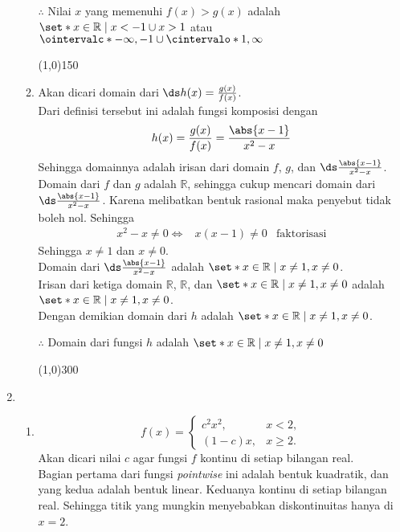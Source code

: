 \begin{enumerate}[leftmargin=*, label={\arabic*}.]
\begin{enumerate}[label={\alph*}.]
$\therefore$ Nilai $x$ yang memenuhi $f(x) > g(x)$ adalah
$\set*{x \in \mathbb{R} \mid x < -1 \cup x > 1}$
atau $\ointervalc*{-\infty, -1} \cup \cintervalo*{1, \infty}$

\begin{center}
    \line(1,0){150}
\end{center}
\item Akan dicari domain dari $\ds h(x) = \frac{g(x)}{f(x)}$.\\
Dari definisi tersebut ini adalah fungsi komposisi dengan 
\[
    h(x) = \frac{g(x)}{f(x)} = \frac{\abs{x-1}}{x^{2}-x}
\]
Sehingga domainnya adalah irisan dari domain $f$, $g$, dan 
$\ds \frac{\abs{x-1}}{x^{2}-x}$.\\
Domain dari $f$ dan $g$ adalah $\mathbb{R}$, sehingga cukup mencari 
domain dari $\ds \frac{\abs{x-1}}{x^{2}-x}$. Karena melibatkan 
bentuk rasional maka penyebut tidak boleh nol. Sehingga
\begin{align*}
    x^{2}-x \neq 0 \iff &x(x-1)\neq 0
    &\text{faktorisasi}
\end{align*}
Sehingga $x \neq 1$ dan $x \neq 0$. \\Domain dari 
$\ds \frac{\abs{x-1}}{x^{2}-x}$ adalah 
$\set*{x \in \mathbb{R} \mid x \neq 1, x\neq 0}$.\\ Irisan dari ketiga domain
$\mathbb{R}$, $\mathbb{R}$, dan $\set*{x \in \mathbb{R} \mid x \neq 1, x\neq 0}$ 
adalah $\set*{x \in \mathbb{R} \mid x \neq 1, x\neq 0}$.\\
Dengan demikian domain dari $h$ adalah 
$\set*{x \in \mathbb{R} \mid x \neq 1, x\neq 0}$.

$\therefore$ Domain dari fungsi $h$ adalah 
$\set*{x \in \mathbb{R} \mid x \neq 1, x\neq 0}$

\begin{center}
    \line(1,0){300}
\end{center}
\end{enumerate}
\item
\begin{enumerate}[label={\alph*}.]
\item \[
f(x) = 
\begin{cases}
    c^{2}x^{2}, &{x < 2},\\
    (1-c)x, &{x \geq 2}.
\end{cases}
\]
Akan dicari nilai $c$ agar fungsi $f$ kontinu di setiap bilangan real.\\
Bagian pertama dari fungsi \textit{pointwise} ini adalah bentuk kuadratik, 
dan yang kedua adalah bentuk linear. Keduanya kontinu di setiap bilangan real. 
Sehingga titik yang mungkin menyebabkan diskontinuitas hanya di $x=2$.


\end{enumerate}
\end{enumerate}
